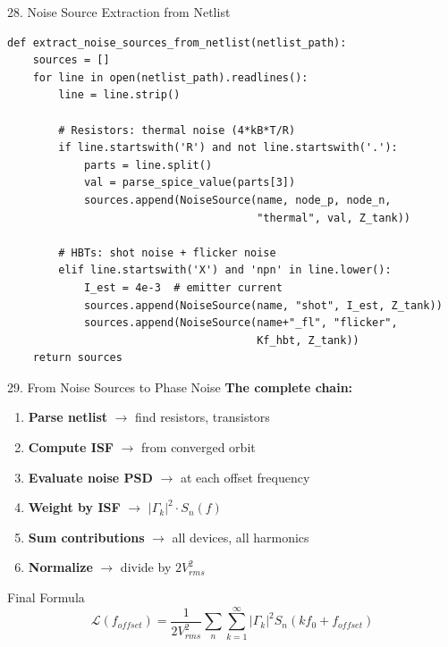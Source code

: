 \documentclass[aspectratio=169, 11pt]{beamer}
\begin{document}
\begin{frame}{28. Noise Source Extraction from Netlist}
    \begin{lstlisting}
def extract_noise_sources_from_netlist(netlist_path):
    sources = []
    for line in open(netlist_path).readlines():
        line = line.strip()

        # Resistors: thermal noise (4*kB*T/R)
        if line.startswith('R') and not line.startswith('.'):
            parts = line.split()
            val = parse_spice_value(parts[3])
            sources.append(NoiseSource(name, node_p, node_n,
                                       "thermal", val, Z_tank))

        # HBTs: shot noise + flicker noise
        elif line.startswith('X') and 'npn' in line.lower():
            I_est = 4e-3  # emitter current
            sources.append(NoiseSource(name, "shot", I_est, Z_tank))
            sources.append(NoiseSource(name+"_fl", "flicker",
                                       Kf_hbt, Z_tank))
    return sources
    \end{lstlisting}
\end{frame}

\begin{frame}{29. From Noise Sources to Phase Noise}
    \textbf{The complete chain:}

    \vspace{0.5em}
    \begin{enumerate}
        \item \textbf{Parse netlist} $\rightarrow$ find resistors, transistors
        \item \textbf{Compute ISF} $\rightarrow$ from converged orbit
        \item \textbf{Evaluate noise PSD} $\rightarrow$ at each offset frequency
        \item \textbf{Weight by ISF} $\rightarrow$ $|\Gamma_k|^2 \cdot S_n(f)$
        \item \textbf{Sum contributions} $\rightarrow$ all devices, all harmonics
        \item \textbf{Normalize} $\rightarrow$ divide by $2V_{rms}^2$
    \end{enumerate}

    \vspace{0.5em}
    \begin{block}{Final Formula}
        \[ \mathcal{L}(f_{offset}) = \frac{1}{2V_{rms}^2} \sum_{n} \sum_{k=1}^{\infty} |\Gamma_k|^2 S_n(k f_0 + f_{offset}) \]
    \end{block}
\end{frame}
\end{document}
